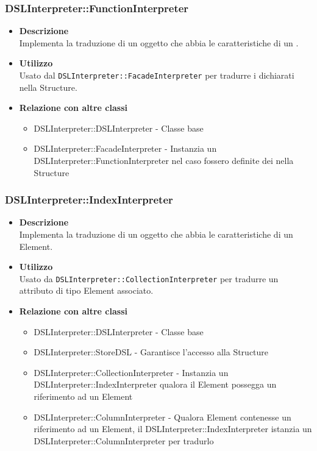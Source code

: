 \subsubsection{DSLInterpreter::FunctionInterpreter}
\begin{itemize}
\item \textbf{Descrizione} \hfill \\
  Implementa la traduzione di un oggetto che abbia le caratteristiche di un .
\item \textbf{Utilizzo} \hfill \\
  Usato dal \texttt{DSLInterpreter::FacadeInterpreter} per tradurre i  dichiarati nella  Structure.
\item \textbf{Relazione con altre classi}
  \begin{itemize}
  \item DSLInterpreter::DSLInterpreter - Classe base
  \item DSLInterpreter::FacadeInterpreter - Instanzia un DSLInterpreter::FunctionInterpreter nel caso fossero definite dei  nella  Structure
  \end{itemize}
\end{itemize}

\subsubsection{DSLInterpreter::IndexInterpreter}
\begin{itemize}
\item \textbf{Descrizione} \hfill \\
  Implementa la traduzione di un oggetto che abbia le caratteristiche di un  Element.
\item \textbf{Utilizzo} \hfill \\
  Usato da \texttt{DSLInterpreter::CollectionInterpreter} per tradurre un attributo di tipo  Element associato.
\item \textbf{Relazione con altre classi}
  \begin{itemize}
  \item DSLInterpreter::DSLInterpreter - Classe base
  \item DSLInterpreter::StoreDSL - Garantisce l'accesso alla  Structure
  \item DSLInterpreter::CollectionInterpreter - Instanzia un DSLInterpreter::IndexInterpreter qualora il  Element possegga un riferimento ad un  Element
  \item DSLInterpreter::ColumnInterpreter - Qualora  Element contenesse un riferimento ad un  Element, il DSLInterpreter::IndexInterpreter istanzia un DSLInterpreter::ColumnInterpreter per tradurlo
  \end{itemize}
\end{itemize}

